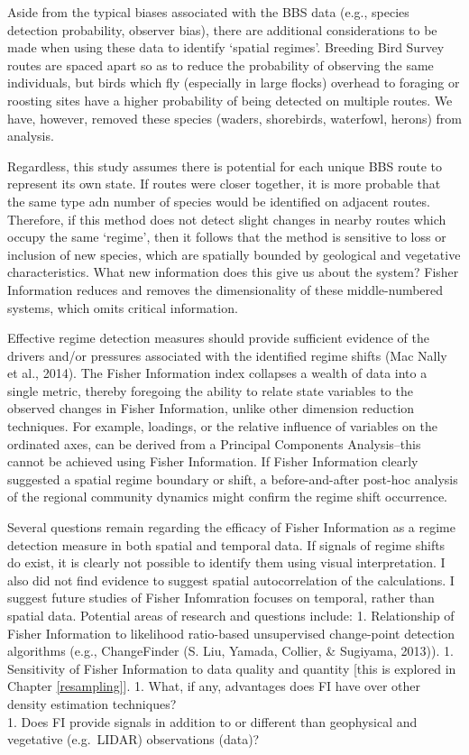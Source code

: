\documentclass[12pt,twoside,openany]{reedthesis}
\begin{document}
Aside from the typical biases associated with the BBS data (e.g.,
species detection probability, observer bias), there are additional
considerations to be made when using these data to identify `spatial
regimes'. Breeding Bird Survey routes are spaced apart so as to reduce
the probability of observing the same individuals, but birds which fly
(especially in large flocks) overhead to foraging or roosting sites have
a higher probability of being detected on multiple routes. We have,
however, removed these species (waders, shorebirds, waterfowl, herons)
from analysis.

Regardless, this study assumes there is potential for each unique BBS
route to represent its own state. If routes were closer together, it is
more probable that the same type adn number of species would be
identified on adjacent routes. Therefore, if this method does not detect
slight changes in nearby routes which occupy the same `regime', then it
follows that the method is sensitive to loss or inclusion of new
species, which are spatially bounded by geological and vegetative
characteristics. What new information does this give us about the
system? Fisher Information reduces and removes the dimensionality of
these middle-numbered systems, which omits critical information.

Effective regime detection measures should provide sufficient evidence
of the drivers and/or pressures associated with the identified regime
shifts (Mac Nally et al., 2014). The Fisher Information index collapses
a wealth of data into a single metric, thereby foregoing the ability to
relate state variables to the observed changes in Fisher Information,
unlike other dimension reduction techniques. For example, loadings, or
the relative influence of variables on the ordinated axes, can be
derived from a Principal Components Analysis--this cannot be achieved
using Fisher Information. If Fisher Information clearly suggested a
spatial regime boundary or shift, a before-and-after post-hoc analysis
of the regional community dynamics might confirm the regime shift
occurrence.

Several questions remain regarding the efficacy of Fisher Information as
a regime detection measure in both spatial and temporal data. If signals
of regime shifts do exist, it is clearly not possible to identify them
using visual interpretation. I also did not find evidence to suggest
spatial autocorrelation of the calculations. I suggest future studies of
Fisher Infomration focuses on temporal, rather than spatial data.
Potential areas of research and questions include: 1. Relationship of
Fisher Information to likelihood ratio-based unsupervised change-point
detection algorithms (e.g., ChangeFinder (S. Liu, Yamada, Collier, \&
Sugiyama, 2013)). 1. Sensitivity of Fisher Information to data quality
and quantity {[}this is explored in Chapter \ref{resampling}{]}. 1.
What, if any, advantages does FI have over other density estimation
techniques?\\
1. Does FI provide signals in addition to or different than geophysical
and vegetative (e.g.~LIDAR) observations (data)?
\end{document}
